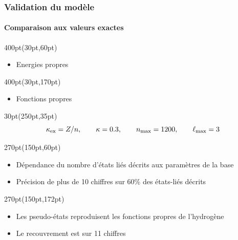 \begin{frame}
 \frametitle{Validation du mod\`ele}
 \framesubtitle{Comparaison aux valeurs exactes}
\begin{textblock*}{400pt}(30pt,60pt)
\small \begin{itemize}
\item Energies propres
\end{itemize}
\begin{table}[p]
 \tiny\centering

\end{table}
\end{textblock*}

\begin{textblock*}{400pt}(30pt,170pt)
\small\begin{itemize}
\item Fonctions propres
\end{itemize}
\begin{table}[p]
 \tiny\centering
 
\end{table}

\end{textblock*}



\begin{textblock*}{30pt}(250pt,35pt)
\tiny
\begin{equation*}
 \kappa_{\rm ex}=Z/n,\qquad \kappa=0.3,\qquad n_{\rm max}=1200, \qquad \ell_{\rm max}=3
\end{equation*}

\end{textblock*}


\begin{textblock*}{270pt}(150pt,60pt)
 \scriptsize
\begin{itemize}
 \item[$\bullet$] D\'ependance du nombre d'\'etats li\'es d\'ecrits aux param\`etres de la base
 \item[$\bullet$] Pr\'ecision de plus de 10 chiffres sur 60\% des \'etats-li\'es d\'ecrits
\end{itemize}

\end{textblock*}


\begin{textblock*}{270pt}(150pt,172pt)
 \scriptsize
\begin{itemize}
 \item[$\bullet$] Les pseudo-\'etats reproduisent les fonctions propres de l'hydrog\`ene
 \item[$\bullet$] Le recouvrement est sur 11 chiffres
\end{itemize}

\end{textblock*}

\end{frame}

